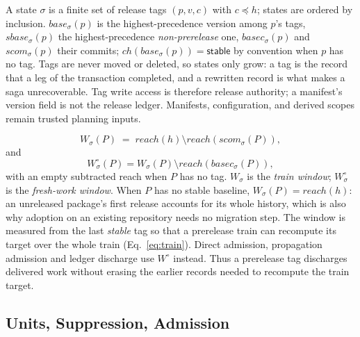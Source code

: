 \documentclass[sigconf,nonacm]{acmart}
\begin{document}
\begin{definition}[state]
\label{def:state}
A state $\sigma$ is a finite set of release tags $(p, v, c)$ with
$c \preceq h$; states are ordered by inclusion. $\mathit{base}_\sigma(p)$
is the highest-precedence version among $p$'s tags,
$\mathit{sbase}_\sigma(p)$ the highest-precedence \emph{non-prerelease}
one, $\mathit{basec}_\sigma(p)$ and $\mathit{scom}_\sigma(p)$ their
commits; $\mathit{ch}(\mathit{base}_\sigma(p)) = \mathsf{stable}$ by
convention when $p$ has no tag. Tags are never moved or deleted, so
states only grow: a tag is the record that a leg of the transaction
completed, and a rewritten record is what makes a saga unrecoverable.
Tag write access is therefore release authority; a manifest's version field
is not the release ledger. Manifests, configuration, and derived scopes remain
trusted planning inputs.
\end{definition}

\begin{definition}
\label{def:window}
\begin{equation}
  W_\sigma(P) \;=\; \mathit{reach}(h) \setminus
                    \mathit{reach}(\mathit{scom}_\sigma(P)),
  \label{eq:window}
\end{equation}
and
\begin{equation}
  W^\circ_\sigma(P) = W_\sigma(P) \setminus
                       \mathit{reach}(\mathit{basec}_\sigma(P)),
  \label{eq:fresh}
\end{equation}
with an empty subtracted reach when $P$ has no tag.  $W_\sigma$ is the
\emph{train window}; $W^\circ_\sigma$ is the \emph{fresh-work window}.
When $P$ has no stable baseline, $W_\sigma(P) = \mathit{reach}(h)$:
an unreleased package's first release accounts for its whole
history, which is also why adoption on an existing repository needs no
migration step. The window is measured from the last \emph{stable} tag
so that a prerelease train can recompute its target over the whole train
(Eq.~\ref{eq:train}). Direct admission, propagation admission and ledger
discharge use $W^\circ$ instead. Thus a prerelease tag discharges delivered
work without erasing the earlier records needed to recompute the train target.
\end{definition}

\subsection{Units, Suppression, Admission}
\end{document}
